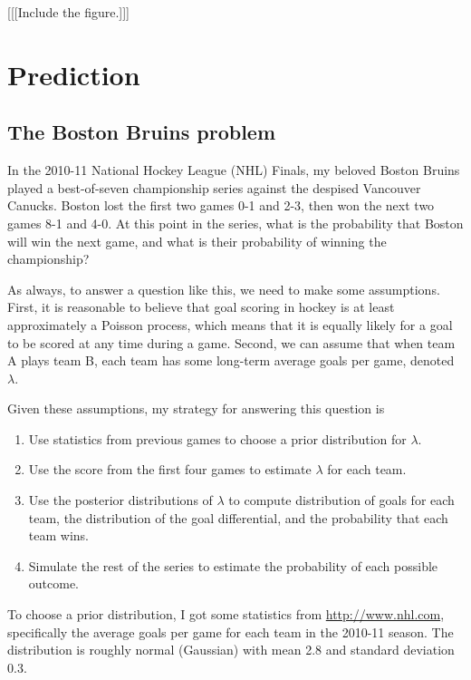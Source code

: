 \documentclass[12pt]{book}
\begin{document}
[[[Include the figure.]]]


\chapter{Prediction}

\section{The Boston Bruins problem}

In the 2010-11 National Hockey League (NHL) Finals, my beloved Boston
Bruins played a best-of-seven championship series against the despised
Vancouver Canucks.  Boston lost the first two games 0-1 and 2-3, then
won the next two games 8-1 and 4-0.  At this point in the series, what
is the probability that Boston will win the next game, and what is
their probability of winning the championship?

As always, to answer a question like this, we need to make some
assumptions.  First, it is reasonable to believe that goal scoring in
hockey is at least approximately a Poisson process, which means that
it is equally likely for a goal to be scored at any time during a
game.  Second, we can assume that when team A plays team B, each team
has some long-term average goals per game, denoted $\lambda$.

Given these assumptions, my strategy for answering this question is

\begin{enumerate}

\item Use statistics from previous games to choose a prior
distribution for $\lambda$.

\item Use the score from the first four games to estimate $\lambda$
for each team.

\item Use the posterior distributions of $\lambda$ to compute 
distribution of goals for each team, the distribution of the
goal differential, and the probability that each team wins.

\item Simulate the rest of the series to estimate the probability
of each possible outcome.

\end{enumerate}

To choose a prior distribution, I got some statistics from
\url{http://www.nhl.com}, specifically the average goals per game
for each team in the 2010-11 season.  The distribution is roughly
normal (Gaussian) with mean 2.8 and standard deviation 0.3.
\end{document}

